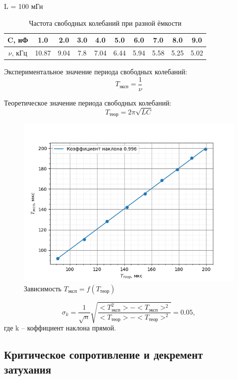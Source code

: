 \documentclass[a4paper,12 pt]{article}
\begin{document}
L = 100 мГн


\begin{table}[H]
    \centering
    \begin{tabular}{|c|c|c|c|c|c|c|c|c|c|}
    \hline
        C, нФ & 1.0 & 2.0 & 3.0 & 4.0 & 5.0 & 6.0 & 7.0 & 8.0 & 9.0 \\
    \hline
    $\nu$, кГц & 10.87 & 9.04 & 7.8 & 7.04 & 6.44 & 5.94 & 5.58 & 5.25 & 5.02 \\
    \hline
    \end{tabular}
    \caption{Частота свободных колебаний при разной ёмкости}
\end{table}

Экспериментальное значение периода свободных колебаний:
\[T_{\text{эксп}} = \frac{1}{\nu}\]

Теоретическое значение периода свободных колебаний:
\[T_{\text{теор}} = 2\pi \sqrt{LC}\]


\begin{figure}[H]
    \centering
    \includegraphics[scale=0.8]{периоды.png}
    \caption{Зависимость $T_{\text{эксп}} = f(T_{\text{теор}})$}
\end{figure}

\[\sigma_{k} = \frac{1}{\sqrt{n}} \sqrt{\frac{<T_{\text{эксп}}^2>-<T_{\text{эксп}}>^2}{<T_{\text{теор}}>-<T_{\text{теор}}>^2}} = 0.05,\]
где k -- коффициент наклона прямой.

\subsection{Критическое сопротивление и декремент затухания}
\end{document}
